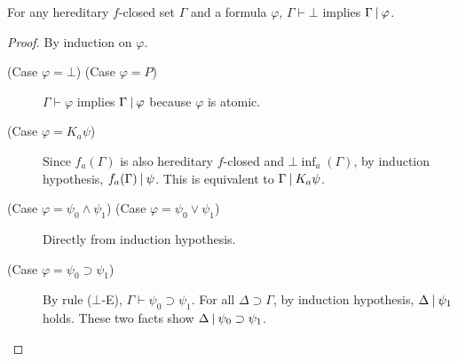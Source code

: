 \begin{lemma}
 \label{absurd}
 For any hereditary $f$-closed set 
 $\Gamma$ and a formula $\varphi$,
 $\Gamma\vdash\bot$ implies $\Gamma\mathbin{\mid}\varphi$.
\end{lemma}
\begin{proof}
 By induction on $\varphi$.
 \begin{description}
  \item[ (Case $\varphi =\bot$) (Case $\varphi =P$)]
	     $\Gamma\vdash\varphi$ implies $\Gamma\mathbin{\mid}\varphi$ because $\varphi$ is
	     atomic.
  \item[ (Case $\varphi = K_a\psi$)]
	     Since $f_a(\Gamma)$ is also hereditary $f$-closed and $\bot\inf_a(\Gamma)$,
	     by induction hypothesis, $f_a(\Gamma)\mathbin{\mid}\psi$.
	     This is equivalent to $\Gamma\mathbin{\mid} K_a\psi$.
  \item[ (Case $\varphi = \psi_0\wedge\psi_1$) (Case $\varphi = \psi_0\vee\psi_1$)]
	     Directly from induction hypothesis.
  \item[ (Case $\varphi = \psi_0\supset\psi_1$)]
	     By rule ($\bot$-E), $\Gamma\vdash\psi_0\supset\psi_1$.
	     For all $\Delta\supset\Gamma$, by induction hypothesis,
	     $\Delta\mathbin{\mid}\psi_1$ holds.
	     These two facts show $\Delta\mathbin{\mid}\psi_0\supset\psi_1$.
 \end{description}
\end{proof}

